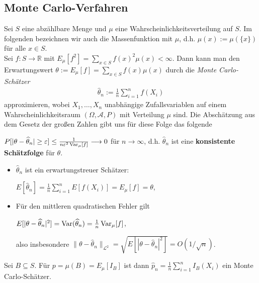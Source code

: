 \subsection{Monte Carlo-Verfahren}
Sei $S$ eine abz\"ahlbare Menge und $\mu$ eine Wahrscheinlichkeitsverteilung
auf $S$. Im folgenden bezeichnen wir auch die Massenfunktion mit $\mu$, d.h.
$\mu (x) := \mu (\{x\}) $ f\"ur alle $x \in S$. \\

Sei $f:S \rightarrow \mathbb{R}$ mit $E_\mu[f^2] = \sum_{x\in S} f(x)^2 \mu (x)
< \infty$. Dann kann man den Erwartungswert $\theta := E_\mu[f] = \sum_{x\in S}
f(x) \mu (x)$ durch die \emph{Monte Carlo-Sch\"atzer} 
\begin{eqnarray}
\widehat{\theta}_n  := \frac{1}{n} \sum_{i=1}^n f(X_i) \nonumber
\end{eqnarray} 
approximieren, wobei $X_1, \ldots, X_n$ unabh\"angige Zufallsvariablen auf
einem Wahrscheinlichkeitsraum $(\Omega, \mathcal{A}, P)$ mit Verteilung $\mu$
sind. Die Absch\"atzung aus dem Gesetz der gro\ss en Zahlen gibt uns f\"ur
diese Folge das folgende

\begin{korollar} $P[|\theta - \widehat{\theta}_n| \geq \varepsilon] \leq
\frac{1}{n \varepsilon^2 \operatorname{Var}_\mu[f]} \longrightarrow 0$ f\"ur $n \rightarrow
\infty$, d.h. $\widehat{\theta}_n$ ist eine \textbf{konsistente Sch\"atzfolge}
f\"ur $\theta$.
\end{korollar}

\begin{bemerkung} \quad
\begin{itemize}
\item $\widehat{\theta}_n$ ist ein erwartungstreuer Sch\"atzer:
\begin{center}
$E[\widehat{\theta}_n] = \frac{1}{n} \sum_{i=1}^n E[f(X_i)] = E_\mu[f] = 
\theta$,
\end{center}
\item F\"ur den mittleren quadratischen Fehler gilt
\begin{center}
$E[|\theta - \widehat{\theta}_n|^2] = \operatorname{Var}(\widehat{\theta}_n) = \frac{1}{n}
\operatorname{Var}_\mu[f]$,
\end{center}
also insbesondere $\| \theta - \widehat{\theta}_n \|_{\mathcal{L}^2} = \sqrt{
E[|\theta - \widehat{\theta}_n|^2]} = O(1/\sqrt{n})$.
\end{itemize}
\end{bemerkung}

\begin{beispiel} Sei $B \subseteq S$. F\"ur $p = \mu(B) = E_\mu[I_B]$ ist dann
$\widehat{p}_n = \frac{1}{n} \sum_{i=1}^n I_B(X_i)$ ein Monte Carlo-Sch\"atzer.
\end{beispiel}

